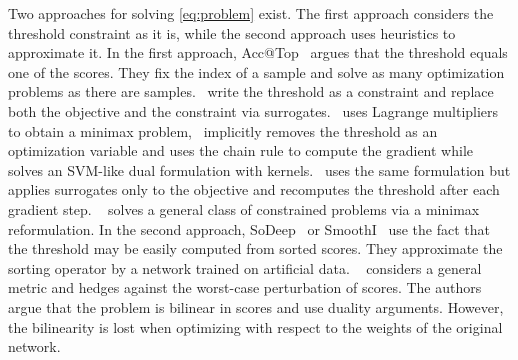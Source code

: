 Two approaches for solving \eqref{eq:problem} exist. The first approach considers the threshold constraint as it is, while the second approach uses heuristics to approximate it. In the first approach, Acc@Top~\cite{boyd2012accuracy} argues that the threshold equals one of the scores. They fix the index of a sample and solve as many optimization problems as there are samples.~\cite{eban2017scalable,adam2021general,kumar2021implicit} write the threshold as a constraint and replace both the objective and the constraint via surrogates.~\cite{eban2017scalable} uses Lagrange multipliers to obtain a minimax problem,~\cite{mackey2018constrained} implicitly removes the threshold as an optimization variable and uses the chain rule to compute the gradient while~\cite{macha2020nonlinear} solves an SVM-like dual formulation with kernels.~\cite{grill2016learning} uses the same formulation but applies surrogates only to the objective and recomputes the threshold after each gradient step. \TFCO~\cite{cotter2019optimization} solves a general class of constrained problems via a minimax reformulation. In the second approach, SoDeep~\cite{engilberge2019sodeep} or SmoothI~\cite{thonet2021smoothi} use the fact that the threshold may be easily computed from sorted scores. They approximate the sorting operator by a network trained on artificial data. \APPerf~\cite{fathony2019ap} considers a general metric and hedges against the worst-case perturbation of scores. The authors argue that the problem is bilinear in scores and use duality arguments. However, the bilinearity is lost when optimizing with respect to the weights of the original network. 